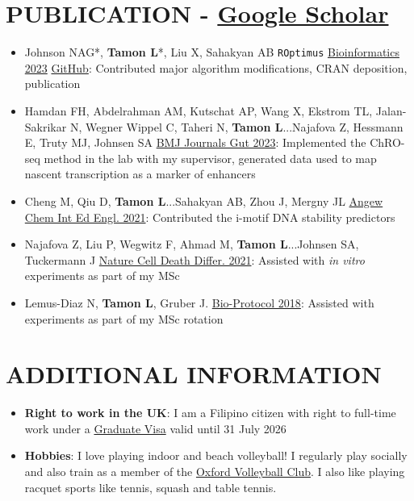 \documentclass{article}
\newcommand{\resumeItem}[2]{
  \item\small{
    \textbf{#1}{: #2 \vspace{-2pt}}
  }
}
\newcommand{\resumeSubItem}[2]{\resumeItem{#1}{#2}\vspace{-4pt}}
\newcommand{\resumeSubHeadingListStart}{\begin{itemize}[leftmargin=*]}
\newcommand{\resumeSubHeadingListEnd}{\end{itemize}}
\begin{document}
\section{PUBLICATION - \href{https://scholar.google.com/citations?user=XYWobTUAAAAJ&hl=en}{Google Scholar}}
    \begin{itemize}
        \item {Johnson NAG*, \textbf{Tamon L}*, Liu X, Sahakyan AB \texttt{ROptimus} \href{https://doi.org/10.1093/bioinformatics/btad292}{Bioinformatics 2023} \href{https://github.com/SahakyanLab/ROptimus}{GitHub}: Contributed major algorithm modifications, CRAN deposition, publication}

            \item {Hamdan FH, Abdelrahman AM, Kutschat AP, Wang X, Ekstrom TL, Jalan-Sakrikar N, Wegner Wippel C, Taheri N, \textbf{Tamon L}...Najafova Z, Hessmann E, Truty MJ, Johnsen SA \href{http://dx.doi.org/10.1136/gutjnl-2022-328154}{BMJ Journals Gut 2023}: Implemented the ChRO-seq method in the lab with my supervisor, generated data used to map nascent transcription as a marker of enhancers}

            \item {Cheng M, Qiu D, \textbf{Tamon L}...Sahakyan AB, Zhou J, Mergny JL \href{https://doi.org/10.1002/anie.202016801}{Angew Chem Int Ed Engl. 2021}: Contributed the i-motif DNA stability predictors}

            \item {Najafova Z, Liu P, Wegwitz F, Ahmad M, \textbf{Tamon L}...Johnsen SA, Tuckermann J \href{https://doi.org/10.1038/s41418-020-00614-w}{Nature Cell Death Differ. 2021}: Assisted with \textit{in vitro} experiments as part of my MSc}
            
            \item {Lemus-Diaz N, \textbf{Tamon L}, Gruber J. \href{https://doi.org/10.21769/BioProtoc.3000}{Bio-Protocol 2018}: Assisted with experiments as part of my MSc rotation}
    \end{itemize}
          
\section{ADDITIONAL INFORMATION}
  \resumeSubHeadingListStart
    \resumeSubItem{Right to work in the UK}{I am a Filipino citizen with right to full-time work under a \href{https://www.gov.uk/graduate-visa}{Graduate Visa} valid until 31 July 2026}
    \resumeSubItem{Hobbies}
    {I love playing indoor and beach volleyball! I regularly play socially and also train as a member of the \href{http://www.oxfordvolleyball.co.uk}{Oxford Volleyball Club}. I also like playing racquet sports like tennis, squash and table tennis.}
  \resumeSubHeadingListEnd
\end{document}
